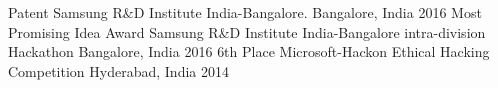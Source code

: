 \begin{cvhonors}
  \cvhonor
  {Patent}
  {Samsung R\&D Institute India-Bangalore.}
  {Bangalore, India}
  {2016}
  \cvhonor
    {Most Promising Idea Award}
    {Samsung R\&D Institute India-Bangalore intra-division Hackathon}
    {Bangalore, India}
    {2016}
  \cvhonor
    {6th Place}
    {Microsoft-Hackon Ethical Hacking Competition}
    {Hyderabad, India}
    {2014}
  
\end{cvhonors}

